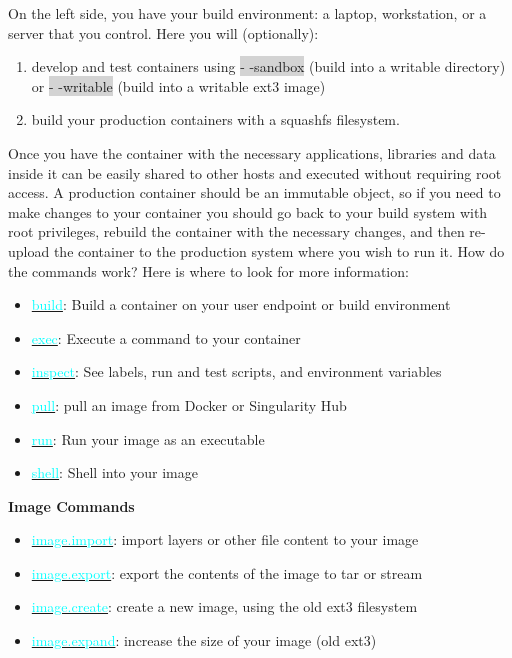 \documentclass[a4paper]{article}
\newcounter{subsubsubsection}[subsubsection]
\begin{document}
On the left side, you have your build environment: a laptop, workstation, or a server that you control. Here you will (optionally):
\\
\begin{enumerate}
\item develop and test containers using \colorbox{lightgray}{- -sandbox} (build into a writable directory) or  \colorbox{lightgray}{- -writable} (build into a writable ext3 image)
\item build your production containers with a squashfs filesystem.
\end{enumerate}
Once you have the container with the necessary applications, libraries and data inside it can be easily shared to other hosts and executed without requiring root access. A production container should be an immutable object, so if you need to make changes to your container you should go back to your build system with root privileges, rebuild the container with the necessary changes, and then re-upload the container to the production system where you wish to run it.
How do the commands work? Here is where to look for more information:
\\[0.1in]
\begin{itemize}
\item \hyperref[sec:build]{{\textcolor{cyan}{build}}}: Build a container on your user endpoint or build environment
\item \hyperref[sec:exec]{{\textcolor{cyan}{exec}}}: Execute a command to your container
\item \hyperref[sec:inspect]{{\textcolor{cyan}{inspect}}}: See labels, run and test scripts, and environment variables
\item \hyperref[sec:pull]{{\textcolor{cyan}{pull}}}: pull an image from Docker or Singularity Hub
\item \hyperref[sec:run]{{\textcolor{cyan}{run}}}: Run your image as an executable
\item \hyperref[sec:shell]{{\textcolor{cyan}{shell}}}: Shell into your image
\end{itemize}


\noindent\textbf{Image Commands}

\begin{itemize}
\item \hyperref[sec:imageimport]{{\textcolor{cyan}{image.import}}}: import layers or other file content to your image
\item \hyperref[sec:imageexport]{{\textcolor{cyan}{image.export}}}: export the contents of the image to tar or stream
\item \hyperref[sec:imagecreate]{{\textcolor{cyan}{image.create}}}: create a new image, using the old ext3 filesystem
\item \hyperref[sec:imageexpand]{{\textcolor{cyan}{image.expand}}}: increase the size of your image (old ext3)
\end{itemize}
\end{document}
